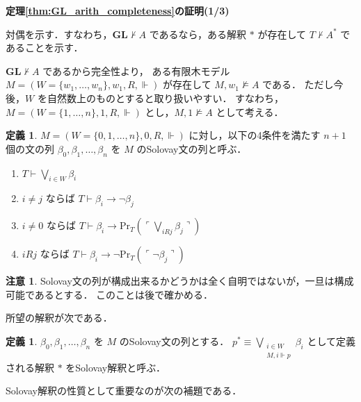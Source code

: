 \documentclass{jsarticle}
\makeatletter
\newcommand*{\Logic}[1]{\mathbf{#1}}
\newcommand*{\LogicGL}{\Logic{GL}}
\newcommand*{\Provable}{\mathrm{Pr}}
\theoremstyle{definition}
\newtheorem{definition}[theorem]{定義}
\newtheorem{remark}[theorem]{注意}
\renewcommand{\proofname}{証明}
\renewenvironment{proof}[1][\proofname]{\par
    \normalfont 
    \topsep6\p@\@plus6\p@\relax
    \trivlist
    \item\relax
    {\bfseries\gtfamily
    #1\@addpunct{.}}\hspace\labelsep\ignorespaces
    }{%
    \endtrivlist
    \@endpefalse
}
\makeatother
\begin{document}
\begin{proof}[定理\ref{thm:GL_arith_completeness}の証明(1/3)]
    対偶を示す．すなわち，$\LogicGL \nvdash A$ であるなら，ある解釈 $*$ が存在して $T \nvdash A^*$ であることを示す．

    $\LogicGL \nvdash A$ であるから完全性より，
    ある有限木モデル $M = (W = \{w_1, \dots, w_n\}, w_1, R, \Vdash)$ が存在して $M,w_1 \nvDash A$ である．
    ただし今後，$W$ を自然数上のものとすると取り扱いやすい．
    すなわち，$M = (W = \{1,\dots,n\}, 1, R, \Vdash)$ とし，$M,1 \nvDash A$ として考える．
\end{proof}


\begin{definition}
    $M = (W = \{0,1,\dots,n\}, 0, R, \Vdash)$ に対し，以下の4条件を満たす $n + 1$ 個の文の列 $\beta_0, \beta_1, \dots, \beta_n$ を $M$ のSolovay文の列と呼ぶ．
    \begin{enumerate}
        \item $T \vdash \bigvee_{i \in W} \beta_i$
        \item $i \neq j$ ならば $T \vdash \beta_i \to \lnot \beta_j$
        \item $i \neq 0$ ならば $T \vdash \beta_i \to \Provable_T(\ulcorner \bigvee_{i R j} \beta_j \urcorner)$
        \item $i R j$ ならば $T \vdash \beta_i \to \lnot \Provable_T(\ulcorner \lnot \beta_j \urcorner)$ 
    \end{enumerate}
\end{definition}

\begin{remark}
    Solovay文の列が構成出来るかどうかは全く自明ではないが，一旦は構成可能であるとする．
    このことは後で確かめる．
\end{remark}

所望の解釈が次である．

\begin{definition}
    $\beta_0, \beta_1, \dots, \beta_n$ を $M$ のSolovay文の列とする．
    $p^* \equiv \bigvee_{\substack{i \in W \\ M, i \Vdash p}} \beta_i$ として定義される解釈 $*$ をSolovay解釈と呼ぶ．
\end{definition}

Solovay解釈の性質として重要なのが次の補題である．
\end{document}
